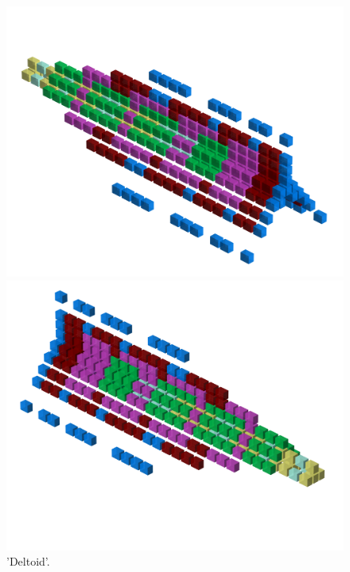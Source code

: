 \begin{minipage}[b]{0.48\linewidth}
\begin{figure}[H]
    \centering
    \begin{adjustbox}{width=6cm,margin=0cm 0cm}
      \includegraphics[width=12cm]{src/patterns/pattern4-45.png}%
    \end{adjustbox}
    \begin{adjustbox}{width=6cm,margin=0cm -1.8cm}
      \includegraphics[width=12cm]{src/patterns/pattern4-225.png}%
    \end{adjustbox}
\caption{'Deltoid'.}
\end{figure}
\end{minipage}
